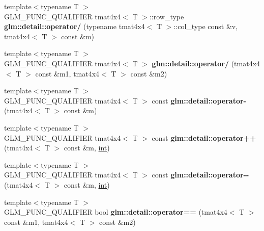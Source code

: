 \begin{DoxyCompactItemize}
\item 
\hypertarget{namespaceglm_1_1detail_aec04bbab896710a238403f28ee25c7f7}{}{\footnotesize template$<$typename T $>$ }\\G\+L\+M\+\_\+\+F\+U\+N\+C\+\_\+\+Q\+U\+A\+L\+I\+F\+I\+E\+R tmat4x4$<$ T $>$\+::row\+\_\+type {\bfseries glm\+::detail\+::operator/} (typename tmat4x4$<$ T $>$\+::col\+\_\+type const \&v, tmat4x4$<$ T $>$ const \&m)\label{namespaceglm_1_1detail_aec04bbab896710a238403f28ee25c7f7}

\item 
\hypertarget{namespaceglm_1_1detail_aef28094878813f4a07e17ab4b9e76272}{}{\footnotesize template$<$typename T $>$ }\\G\+L\+M\+\_\+\+F\+U\+N\+C\+\_\+\+Q\+U\+A\+L\+I\+F\+I\+E\+R tmat4x4$<$ T $>$ {\bfseries glm\+::detail\+::operator/} (tmat4x4$<$ T $>$ const \&m1, tmat4x4$<$ T $>$ const \&m2)\label{namespaceglm_1_1detail_aef28094878813f4a07e17ab4b9e76272}

\item 
\hypertarget{namespaceglm_1_1detail_af5e7bbe52d8f7c5cb5a317b616cdaf2c}{}{\footnotesize template$<$typename T $>$ }\\G\+L\+M\+\_\+\+F\+U\+N\+C\+\_\+\+Q\+U\+A\+L\+I\+F\+I\+E\+R tmat4x4$<$ T $>$ const {\bfseries glm\+::detail\+::operator-\/} (tmat4x4$<$ T $>$ const \&m)\label{namespaceglm_1_1detail_af5e7bbe52d8f7c5cb5a317b616cdaf2c}

\item 
\hypertarget{namespaceglm_1_1detail_aa5e18871374b599d72761351699cd204}{}{\footnotesize template$<$typename T $>$ }\\G\+L\+M\+\_\+\+F\+U\+N\+C\+\_\+\+Q\+U\+A\+L\+I\+F\+I\+E\+R tmat4x4$<$ T $>$ const {\bfseries glm\+::detail\+::operator++} (tmat4x4$<$ T $>$ const \&m, \hyperlink{_s_d_l__thread_8h_a6a64f9be4433e4de6e2f2f548cf3c08e}{int})\label{namespaceglm_1_1detail_aa5e18871374b599d72761351699cd204}

\item 
\hypertarget{namespaceglm_1_1detail_af0e5b1193ec997b1c8f366521b727e25}{}{\footnotesize template$<$typename T $>$ }\\G\+L\+M\+\_\+\+F\+U\+N\+C\+\_\+\+Q\+U\+A\+L\+I\+F\+I\+E\+R tmat4x4$<$ T $>$ const {\bfseries glm\+::detail\+::operator-\/-\/} (tmat4x4$<$ T $>$ const \&m, \hyperlink{_s_d_l__thread_8h_a6a64f9be4433e4de6e2f2f548cf3c08e}{int})\label{namespaceglm_1_1detail_af0e5b1193ec997b1c8f366521b727e25}

\item 
\hypertarget{namespaceglm_1_1detail_a3c172feec00f7d940e4acea842841699}{}{\footnotesize template$<$typename T $>$ }\\G\+L\+M\+\_\+\+F\+U\+N\+C\+\_\+\+Q\+U\+A\+L\+I\+F\+I\+E\+R bool {\bfseries glm\+::detail\+::operator==} (tmat4x4$<$ T $>$ const \&m1, tmat4x4$<$ T $>$ const \&m2)\label{namespaceglm_1_1detail_a3c172feec00f7d940e4acea842841699}


\end{DoxyCompactItemize}
